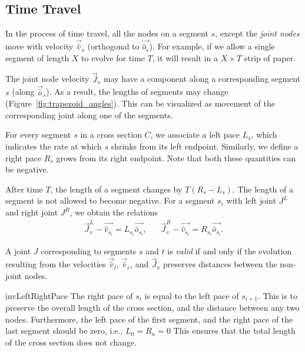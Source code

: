 \subsection{Time Travel}
\label{sec:time_travel}

In the process of time travel, all the nodes on a segment $s$, except the
\emph{joint nodes} move with velocity $\vec{\hat v}_s$ (orthogonal to $\vec{\hat
o_s}$). For example, if we allow a single segment of length $X$ to evolve for
time $T$, it will result in a $X\times T$ strip of paper.

The joint node velocity $\vec J_v$ may have a component along a corresponding
segment $s$ (along $\vec{\hat o}_s$). As a result, the lengths of segments may
change (Figure~\ref{fig:trapezoid_angles}). This can be visualized as movement
of the corresponding joint along one of the segments.

\begin{definition}
\label{def:segment_length}
For every segment $s$ in a cross section $C$, we associate a left pace $L_s$,
which indicates the rate at which $s$ shrinks from its left endpoint.
Similarly, we define a right pace $R_s$ grows from its right endpoint.
Note that both these quantities can be negative.
\end{definition}
After time $T$, the length of a segment changes by $T(R_s-L_s)$.
The length of a segment is not allowed to become negative.
For a segment $s_i$ with left joint $J^L$ and right joint $J^R$, we obtain the relations
\begin{align*}
\vec J_v^L-\vec{\hat v_{s_i}} = L_{s_i} \vec{\hat o_{s_i}}, && \vec J_v^R-\vec{\hat v_{s_i}} = R_{s_i} \vec{\hat o_{s_i}}.
\end{align*}

\begin{definition}
\label{def:valid_joint}
A joint $J$ corresponding to segments $s$ and $t$ is \emph{valid} if and only if the evolution
resulting from the velocities $\vec{\hat v}_l$, $\vec{\hat v}_r$, and $\vec J_v$ preserves distances between the non-joint nodes.
\end{definition}
\vspace{-1pc}
\begin{restatable}{inv}{LeftRightPace}
\label{inv:left_right_pace}
The right pace of $s_{i}$ is equal to the left pace of $s_{i+1}$.
This is to preserve the overall length of the cross section, and the distance between any two nodes.
Furthermore, the left pace of the first segment, and the right pace of the last segment should be zero, i.e., $L_0 = R_n = 0$
This ensures that the total length of the cross section does not change.
\end{restatable}

